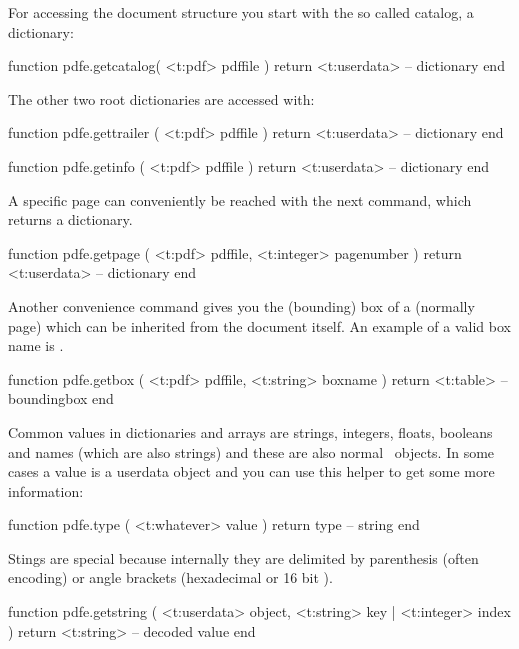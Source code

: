 \stopsubsection

\startsubsection[title={The main structure}]

For accessing the document structure you start with the so called catalog, a
dictionary:

\starttyping[option=LUA]
function pdfe.getcatalog( <t:pdf> pdffile )
    return <t:userdata> -- dictionary
end
\stoptyping

The other two root dictionaries are accessed with:

\starttyping[option=LUA]
function pdfe.gettrailer ( <t:pdf> pdffile )
    return <t:userdata> -- dictionary
end

function pdfe.getinfo ( <t:pdf> pdffile )
    return <t:userdata> -- dictionary
end
\stoptyping

\stopsubsection

\startsubsection[title={Getting content}]

A specific page can conveniently be reached with the next command, which returns
a dictionary.

\starttyping[option=LUA]
function pdfe.getpage ( <t:pdf> pdffile, <t:integer> pagenumber )
    return <t:userdata> -- dictionary
end
\stoptyping

Another convenience command gives you the (bounding) box of a (normally page)
which can be inherited from the document itself. An example of a valid box name
is .

\starttyping[option=LUA]
function pdfe.getbox ( <t:pdf> pdffile, <t:string> boxname )
    return <t:table> -- boundingbox
end
\stoptyping

\stopsubsection

\startsubsection[title={Getters}]

Common values in dictionaries and arrays are strings, integers, floats, booleans
and names (which are also strings) and these are also normal \LUA\ objects. In
some cases a value is a userdata object and you can use this helper to get some
more information:

\starttyping[option=LUA]
function pdfe.type ( <t:whatever> value )
    return type -- string
end
\stoptyping

Stings are special because internally they are delimited by parenthesis (often
 encoding) or angle brackets (hexadecimal or 16 bit \UNICODE).

\starttyping[option=LUA]
function pdfe.getstring (
    <t:userdata> object,
    <t:string>   key | <t:integer> index
)
    return
        <t:string>  -- decoded value
end
\stoptyping

